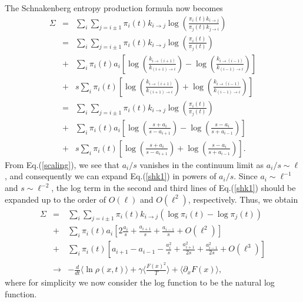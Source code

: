 \documentclass[aps,pre,amsmath,amssymb,floatfix,preprint,nofootinbib]{revtex4}
\begin{document}
The Schnakenberg entropy production formula now becomes
\begin{eqnarray}
\Sigma &=&  \sum_{i}\sum_{j= i \pm 1} \pi_i(t) k_{i \to j} \log \left(\frac{ \pi_i(t) k_{i \to j}}{\pi_j(t)  k_{j \to i}} \right)\nonumber\\
&=&  \sum_{i}\sum_{j= i \pm 1} \pi_i(t) k_{i \to j} \log \left(\frac{ \pi_i(t) }{\pi_j(t) } \right)\nonumber\\
&+&   \sum_{i}  \pi_i(t) a_{i}\left[ \log \left(\frac{  k_{i \to (i+1)}}{  k_{(i+1) \to i}} \right) - \log \left(\frac{  k_{i \to (i-1)}}{ k_{(i-1) \to i}}  \right) \right]\nonumber\\
&+&  s \sum_{i}  \pi_i(t) \left[ \log \left(\frac{  k_{i \to (i+1)}}{  k_{(i+1) \to i}} \right) + \log \left(\frac{ k_{i \to (i-1)}}{  k_{(i-1) \to i}}  \right) \right]\nonumber\\
&=&  \sum_{i}\sum_{j= i \pm 1} \pi_i(t) k_{i \to j} \log \left(\frac{ \pi_i(t) }{\pi_j(t) } \right)\nonumber\\
&+&   \sum_{i}  \pi_i(t) a_{i}\left[ \log \left(\frac{ s + a_i}{s-a_{i+1}} \right) - \log \left(\frac{  s-a_{i}}{ s +a_{i-1}}  \right) \right]\nonumber\\
&+&  s \sum_{i}  \pi_i(t) \left[ \log \left(\frac{  s + a_i}{  s-a_{i+1}} \right) + \log \left(\frac{ s-a_{i}}{ s +a_{i-1}}  \right) \right]. \label{shk1}
\end{eqnarray}
 From Eq.(\ref{scaling}), we see that $a_i/s$ vanishes in the continuum limit as $a_i/s \sim \ell$, and consequently we can expand Eq.(\ref{shk1}) in powers of $a_i/s $. Since $a_i \sim \ell^{-1}$ and $s\sim \ell^{-2}$, the log term in the second and third lines of Eq.(\ref{shk1}) should be expanded up to the order of $O(\ell)$ and $O(\ell^2)$, respectively. Thus, we obtain
\begin{eqnarray}
\Sigma
&=&  \sum_{i}\sum_{j= i \pm 1} \pi_i(t) k_{i \to j} \left( \log  \pi_i(t) - \log  \pi_j(t)  \right)\nonumber\\
&+&   \sum_{i}  \pi_i(t) a_{i}\left[ 2 \frac{a_i}{s} +\frac{a_{i+1}}{s} + \frac{a_{i-1}}{s}+ O(\ell^2) \right]\nonumber\\
&+&   \sum_{i}  \pi_i(t) \left[ a_{i+1} - a_{i-1}  - \frac{a_{i}^2}{s}+\frac{a_{i+1}^2}{2 s}+\frac{a_{i-1}^2}{2 s} + O(\ell^3) \right]\nonumber\\
&\to& -\frac{d}{dt} \langle  \ln \rho(x,t) \rangle + \gamma \langle  \frac{F(x)^2}{T} \rangle + \langle \partial_x F(x) \rangle,
 \label{shk2}
\end{eqnarray}
where for simplicity we now consider the log function to be the natural log function. 
\end{document}
